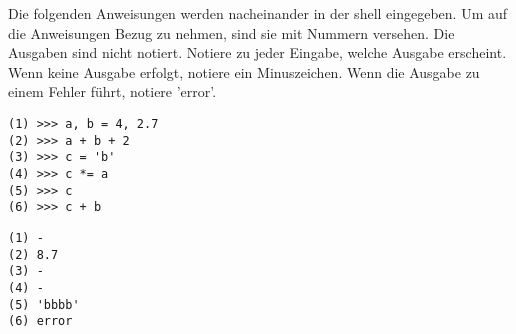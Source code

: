 \question[3]
Die folgenden Anweisungen werden nacheinander in der shell eingegeben. Um auf die Anweisungen Bezug
zu nehmen, sind sie mit Nummern versehen. Die Ausgaben sind nicht notiert.
Notiere zu jeder Eingabe, welche Ausgabe
erscheint. Wenn keine Ausgabe erfolgt, notiere
ein Minuszeichen. Wenn die Ausgabe zu einem Fehler führt, notiere 'error'.

\begin{lstlisting}
(1) >>> a, b = 4, 2.7
(2) >>> a + b + 2
(3) >>> c = 'b'
(4) >>> c *= a
(5) >>> c
(6) >>> c + b
\end{lstlisting}
\begin{solutionbox}{5cm}
\begin{lstlisting}
(1) -
(2) 8.7
(3) -
(4) -
(5) 'bbbb'
(6) error
\end{lstlisting}
\end{solutionbox}

